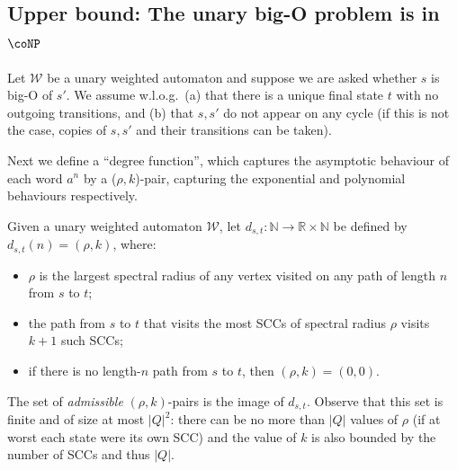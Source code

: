 \documentclass[10pt,a4paper]{amsart}
\numberwithin{equation}{section}
\theoremstyle{plain}
\theoremstyle{definition}
\theoremstyle{remark}
\newcommand\dgf{d}
\newcommand\wa{\mathcal{W}}
\begin{document}
\subsection{Upper bound: The unary big-O problem is in \texorpdfstring{$\coNP$}{coNP}}
\label{sec:conpsec:upperbound}
Let $\wa$ be a unary weighted automaton and suppose we are asked whether $s$ is big-O of $s'$. We assume  w.l.o.g.\label{conp-ub-assumptions}~(a) that there is a unique final state $t$ with no outgoing transitions, and (b) that $s,s'$ do not appear on any cycle (if this is not the case, copies of $s,s'$ and their transitions can be taken).

Next we define  a ``degree function'', which captures the asymptotic behaviour of each word $a^n$ by a ($\rho,k$)-pair, capturing the exponential and polynomial behaviours respectively.

\begin{defi}\label{def:unarydegreefunction}
Given a unary weighted automaton $\wa$, let $\dgf_{s,t} : \mathbb{N} \to \mathbb{R} \times \mathbb{N}$ be defined by $\dgf_{s,t}(n) = (\rho,k)$, where:
\begin{itemize}
  \item $\rho$ is the largest spectral radius of any vertex visited on any path of length $n$ from $s$ to $t$;
  \item the path from $s$ to $t$ that visits the most SCCs of spectral radius $\rho$ visits $k+1$ such SCCs;
  \item if there is no length-$n$ path  from $s$ to $t$, then $(\rho,k){=}(0,0)$.
\end{itemize}
\end{defi}

The set of \textit{admissible} $(\rho,k)$-pairs is the image of $\dgf_{s,t}$. Observe that this set is finite and of size at most $|Q|^2$: there can be no more than $|Q|$ values of $\rho$ (if at worst each state were its own SCC) and the value of $k$  is also bounded by the number of SCCs and thus $|Q|$.
\end{document}
